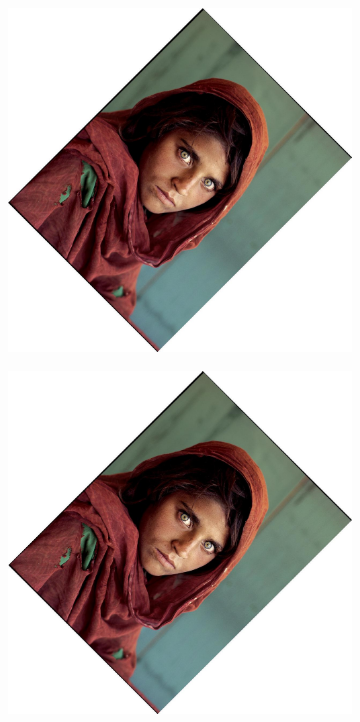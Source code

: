 \documentclass{article}
\begin{document}
\begin{figure}[H]
    \centering
    \begin{subfigure}{.3\textwidth}
        \centering
        \includegraphics[scale=0.04]{q1/output/similar_1_0.5_2.jpg}
    \end{subfigure}
    \begin{subfigure}{.3\textwidth}
        \centering
        \includegraphics[scale=0.04]{q1/output/similar_1_1_2.jpg}

\end{subfigure}
\end{figure}
\end{document}
